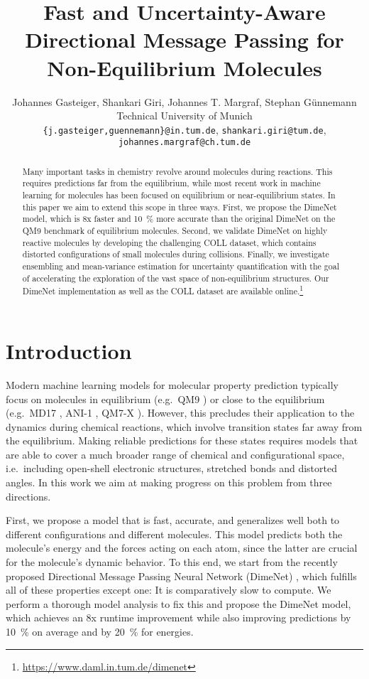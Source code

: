 \documentclass{article}
\title{Fast and Uncertainty-Aware Directional Message Passing for Non-Equilibrium Molecules}
\author{Johannes Gasteiger, Shankari Giri, Johannes T. Margraf, Stephan Günnemann\\
  Technical University of Munich\\
  \texttt{\{j.gasteiger,guennemann\}@in.tum.de}, \texttt{shankari.giri@tum.de},\\ \texttt{johannes.margraf@ch.tum.de}\\
}
\begin{document}
\maketitle

\begin{abstract}
Many important tasks in chemistry revolve around molecules during reactions. This requires predictions far from the equilibrium, while most recent work in machine learning for molecules has been focused on equilibrium or near-equilibrium states. In this paper we aim to extend this scope in three ways. First, we propose the DimeNet model, which is 8x faster and \SI{10}{\percent} more accurate than the original DimeNet on the QM9 benchmark of equilibrium molecules. Second, we validate DimeNet on highly reactive molecules by developing the challenging \textsc{COLL} dataset, which contains distorted configurations of small molecules during collisions. Finally, we investigate ensembling and mean-variance estimation for uncertainty quantification with the goal of accelerating the exploration of the vast space of non-equilibrium structures. Our DimeNet implementation as well as the \textsc{COLL} dataset are available online.\footnote{\url{https://www.daml.in.tum.de/dimenet}}
\end{abstract}

\section{Introduction} \label{sec:intro}

Modern machine learning models for molecular property prediction typically focus on molecules in equilibrium (e.g.\ QM9 \cite{ramakrishnan_quantum_2014}) or close to the equilibrium (e.g.\ MD17 \cite{chmiela_machine_2017}, ANI-1 \cite{smith_ani-1_2017}, QM7-X \cite{hoja_qm7-x_2020}). However, this precludes their application to the dynamics during chemical reactions, which involve transition states far away from the equilibrium. Making reliable predictions for these states requires models that are able to cover a much broader range of chemical and configurational space, i.e.\ including open-shell electronic structures, stretched bonds and distorted angles. In this work we aim at making progress on this problem from three directions.

First, we propose a model that is fast, accurate, and generalizes well both to different configurations and different molecules. This model predicts both the molecule's energy and the forces acting on each atom, since the latter are crucial for the molecule's dynamic behavior. To this end, we start from the recently proposed Directional Message Passing Neural Network (DimeNet) \cite{gasteiger_directional_2020}, which fulfills all of these properties except one: It is comparatively slow to compute. We perform a thorough model analysis to fix this and propose the DimeNet model, which achieves an 8x runtime improvement while also improving predictions by \SI{10}{\percent} on average and by \SI{20}{\percent} for energies.
\end{document}
